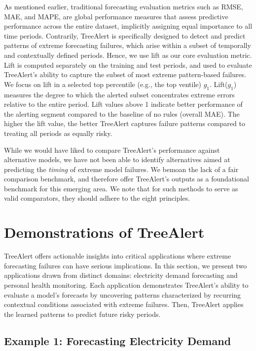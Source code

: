 \documentclass[]{interact}
\theoremstyle{plain}
\theoremstyle{definition}
\theoremstyle{remark}
\begin{document}
As mentioned earlier, traditional forecasting evaluation metrics such as RMSE, MAE, and MAPE, are global performance measures that assess predictive performance across the entire dataset, implicitly assigning equal importance to all time periods. Contrarily, TreeAlert is specifically designed to detect and predict patterns of extreme forecasting failures, which  arise within a subset of temporally and contextually defined periods. Hence, we use lift as our core evaluation metric. Lift is computed separately on the training and test periods, and used to evaluate TreeAlert's ability to capture the subset of most extreme pattern-based failures. We focus on lift in a selected top percentile (e.g., the top ventile) $g_1$. Lift($g_1$) measures the degree to which the alerted subset concentrates extreme errors relative to the entire period. Lift values above 1 indicate better performance of the alerting segment compared to the baseline of no rules (overall MAE). The higher the lift value, the better TreeAlert captures failure patterns compared to treating all periods as equally risky.

While we would have liked to compare TreeAlert's performance against alternative models, we have not been able to identify alternatives aimed at predicting the \emph{timing} of extreme model failures. We bemoan the lack of a fair comparison benchmark, and therefore offer TreeAlert's outputs as a foundational benchmark for this emerging area. We note that for such methods to serve as valid comparators, they should adhere to the eight principles.

\section{Demonstrations of TreeAlert}
\label{sec-demo}

TreeAlert offers actionable insights into critical applications where extreme forecasting
failures can have serious implications. In this section, we present two applications drawn
from distinct domains: electricity demand forecasting and personal health monitoring.
Each application demonstrates TreeAlert's ability  to evaluate a model's forecasts by uncovering patterns characterized by recurring contextual conditions associated with extreme failures. Then, TreeAlert applies the learned patterns to predict future risky periods.

\subsection{Example 1: Forecasting Electricity Demand}
\end{document}

